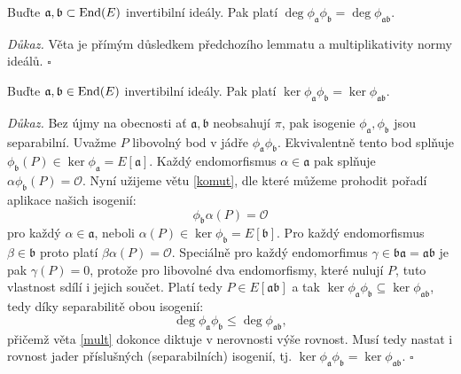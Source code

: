 \documentclass[12pt]{report}
\begin{document}
\begin{dusledek}\label{mult}
Buďte $\mathfrak{a},\mathfrak{b} \subset \operatorname{End}(E)$ invertibilní ideály. Pak platí $\deg \phi_{\mathfrak{a}} \phi_{\mathfrak{b}} = \deg \phi_{\mathfrak{ab}}$.
\end{dusledek}
\noindent \textit{Důkaz.} Věta je přímým důsledkem předchozího lemmatu a multiplikativity normy ideálů. \hfill $\square$\\

\begin{veta}
Buďte $\mathfrak{a},\mathfrak{b} \in \operatorname{End}(E)$ invertibilní ideály. Pak platí $\ker \phi_\mathfrak{a} \phi_\mathfrak{b} = \ker \phi_\mathfrak{ab}$.
\end{veta}
\noindent \textit{Důkaz.} Bez újmy na obecnosti ať $\mathfrak{a},\mathfrak{b}$ neobsahují $\pi$, pak isogenie $\phi_{\mathfrak{a}},\phi_{\mathfrak{b}}$ jsou separabilní. Uvažme $P$ libovolný bod v jádře $\phi_{\mathfrak{a}} \phi_{\mathfrak{b}}$. Ekvivalentně tento bod splňuje $\phi_\mathfrak{b} (P) \in \ker \phi_{\mathfrak{a}} = E[\mathfrak{a}]$. Každý endomorfismus $\alpha \in \mathfrak{a}$ pak splňuje $\alpha \phi_{\mathfrak{b}} (P) = \mathcal{O}$. Nyní užijeme větu \ref{komut}, dle které můžeme prohodit pořadí aplikace našich isogenií:
\begin{equation*}
\phi_{\mathfrak{b}} \alpha (P) = \mathcal{O}
\end{equation*}
pro každý $\alpha \in \mathfrak{a}$, neboli $\alpha (P) \in \ker \phi_{\mathfrak{b}} = E[\mathfrak{b}]$. Pro každý endomorfismus $\beta \in \mathfrak{b}$ proto platí $\beta \alpha (P) = \mathcal{O}$. Speciálně pro každý endomorfimus $\gamma \in \mathfrak{ba} = \mathfrak{ab}$ je pak $\gamma (P) = 0$, protože pro libovolné dva endomorfismy, které nulují $P$, tuto vlastnost sdílí i jejich součet. Platí tedy $P \in E[\mathfrak{ab}]$ a tak $\ker \phi_\mathfrak{a} \phi_{\mathfrak{b}} \subseteq \ker \phi_{\mathfrak{ab}}$, tedy díky separabilitě obou isogenií:
\begin{equation*}
\deg \phi_\mathfrak{a} \phi_{\mathfrak{b}} \leqslant \deg \phi_{\mathfrak{ab}},
 \end{equation*} 
přičemž věta \ref{mult} dokonce diktuje v nerovnosti výše rovnost. Musí tedy nastat i rovnost jader příslušných (separabilních) isogenií, tj. $\ker \phi_\mathfrak{a} \phi_{\mathfrak{b}} = \ker \phi_{\mathfrak{ab}}$. \hfill $\square$\\
\end{document}
